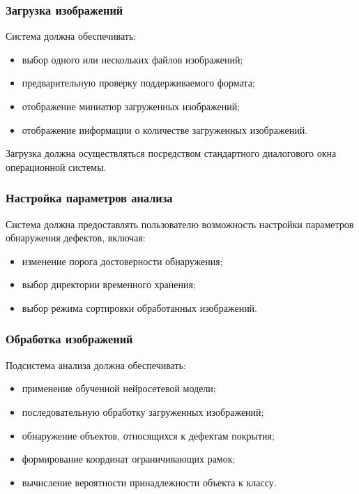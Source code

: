 \subsubsection{Загрузка изображений}

Система должна обеспечивать:

\begin{itemize}
	\item выбор одного или нескольких файлов изображений;
	\item предварительную проверку поддерживаемого формата;
	\item отображение миниатюр загруженных изображений;
	\item отображение информации о количестве загруженных изображений.
\end{itemize}

Загрузка должна осуществляться посредством стандартного диалогового окна операционной системы.

\subsubsection{Настройка параметров анализа}

Система должна предоставлять пользователю возможность настройки параметров обнаружения дефектов, включая:

\begin{itemize}
	\item изменение порога достоверности обнаружения;
	\item выбор директории временного хранения;
	\item выбор режима сортировки обработанных изображений.
\end{itemize}

\subsubsection{Обработка изображений}

Подсистема анализа должна обеспечивать:

\begin{itemize}
	\item применение обученной нейросетевой модели;
	\item последовательную обработку загруженных изображений;
	\item обнаружение объектов, относящихся к дефектам покрытия;
	\item формирование координат ограничивающих рамок;
	\item вычисление вероятности принадлежности объекта к классу.
\end{itemize}

